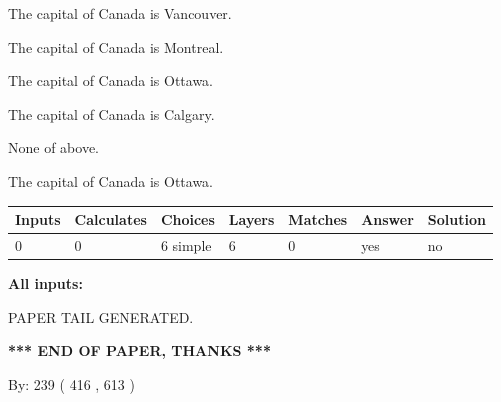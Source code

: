 \documentclass[12pt]{article}
\begin{document}
 
The capital of Canada is Vancouver.
 
 
The capital of Canada is Montreal.
 
 
The capital of Canada is Ottawa.
 
 
The capital of Canada is Calgary.
 
 
 None of above.
 
 
\noindent{}
 
 
The capital of Canada is Ottawa.
 
 
\noindent{}
 
 
   
   
   
   
\noindent\begin{tabular}{|l|l|l|l|l|l|l|}
 \hline
Inputs & Calculates & Choices & Layers & Matches & Answer & Solution \\ \hline
 0  & 
 0  & 
 6
  simple  
  & 
 6  & 
 0  & 
  yes & 
  no 
  \\ \hline
 \end{tabular}
   
   
   
   
\noindent{}
   
   
   
   
\noindent\vspace{0.1in}\hspace{-0.08in} {\textbf{\Large{All inputs: }}}
   
   
   
   
   
   
 \vspace{0.2in}
 
   
   
\vspace{2.0in} PAPER TAIL GENERATED.
   
   
   
   
\vspace{1.0in} 
{\textbf{\large{ *** END OF PAPER, THANKS *** }}} 
   
   
\hspace{1.0in} By: 
 239 ( 416 ,  613 )
   
\end{document}
